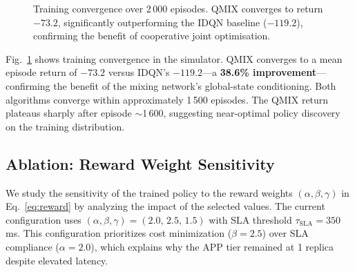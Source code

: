\documentclass[conference]{IEEEtran}
\begin{document}
\begin{figure}[t]
\centering
{}
\caption{Training convergence over 2\,000 episodes. QMIX converges
to return $-73.2$, significantly outperforming the IDQN baseline
($-119.2$), confirming the benefit of cooperative joint optimisation.}
\label{fig:convergence}
\end{figure}

Fig.~\ref{fig:convergence} shows training convergence in the
simulator. QMIX converges to a mean episode return of $-73.2$
versus IDQN's $-119.2$---a \textbf{38.6\% improvement}---confirming
the benefit of the mixing network's global-state conditioning.
Both algorithms converge within approximately 1\,500 episodes.
The QMIX return plateaus sharply after episode $\sim$1\,600,
suggesting near-optimal policy discovery on the training
distribution.

\subsection{Ablation: Reward Weight Sensitivity}

We study the sensitivity of the trained policy to the reward
weights $(\alpha, \beta, \gamma)$ in Eq.~\ref{eq:reward} by
analyzing the impact of the selected values. The current configuration
uses $(\alpha,\beta,\gamma) = (2.0,\,2.5,\,1.5)$ with SLA threshold
$\tau_{\mathrm{SLA}} = 350$\,ms. This configuration prioritizes cost
minimization ($\beta = 2.5$) over SLA compliance ($\alpha = 2.0$),
which explains why the APP tier remained at 1 replica despite elevated
latency.
\end{document}
